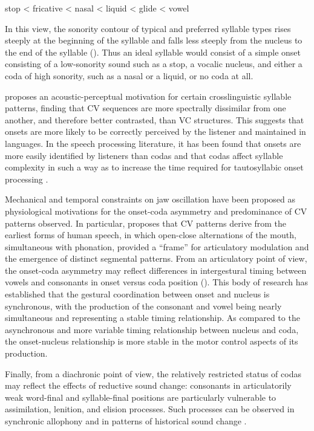 \ea\label{ex:1.6}
  stop < fricative < nasal < liquid < glide < vowel
\z

In this view, the sonority contour of typical and preferred syllable types rises steeply at the beginning of the syllable and falls less steeply from the nucleus to the end of the syllable (\citealt{Zwicky1972,Hooper1976,Greenberg19651978,Clements1990}). Thus an ideal syllable would consist of a simple onset consisting of a low-sonority sound such as a stop, a vocalic nucleus, and either a coda of high sonority, such as a nasal or a liquid, or no coda at all.

  \citet{Kawasaki-Fukumori1992} proposes an acoustic-perceptual motivation for certain crosslinguistic syllable patterns, finding that CV sequences are more spectrally dissimilar from one another, and therefore better contrasted, than VC structures. This suggests that onsets are more likely to be correctly perceived by the listener and maintained in languages. In the speech processing literature, it has been found that onsets are more easily identified by listeners than codas \citep{ContentEtAl2001} and that codas affect syllable complexity in such a way as to increase the time required for tautosyllabic onset processing \citep{SeguiEtAl1991}. 

  Mechanical and temporal constraints on jaw oscillation have been proposed as physiological motivations for the onset-coda asymmetry and predominance of CV patterns observed. In particular, \citet{MacNeilage1998} proposes that CV patterns derive from the earliest forms of human speech, in which open-close alternations of the mouth, simultaneous with phonation, provided a ``frame'' for articulatory modulation and the emergence of distinct segmental patterns. From an articulatory point of view, the onset-coda asymmetry may reflect differences in intergestural timing between vowels and consonants in onset versus coda position (\citealt{Byrd1996a,BrowmanGoldstein1995,GickEtAl2006,MarinPouplier2010}). This body of research has established that the gestural coordination between onset and nucleus is synchronous, with the production of the consonant and vowel being nearly simultaneous and representing a stable timing relationship. As compared to the asynchronous and more variable timing relationship between nucleus and coda, the onset-nucleus relationship is more stable in the motor control aspects of its production.

  Finally, from a diachronic point of view, the relatively restricted status of codas may reflect the effects of reductive sound change: consonants in articulatorily weak word-final and syllable-final positions are particularly vulnerable to assimilation, lenition, and elision processes. Such processes can be observed in synchronic allophony and in patterns of historical sound change \citep{Bybee2015b}.

